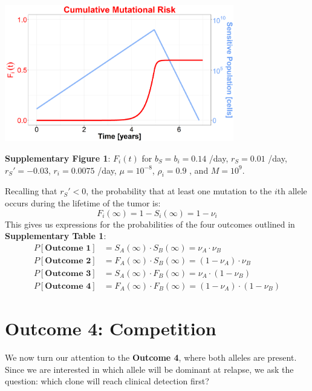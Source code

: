 \documentclass{article}
\begin{document}
\begin{center}
\includegraphics[width=0.75\textwidth]{CumMutRisk}

\textbf{Supplementary Figure 1}: $F_i(t)$ for $b_S = b_i = 0.14$ /day, $r_S = 0.01$ /day, $r_S' = -0.03$, $r_i = 0.0075$ /day, $\mu = 10^{-8}$, $\rho_i = 0.9$ , and $M = 10^9$.
\end{center}

Recalling that $r_S'<0$, the probability that at least one mutation to the $i$th allele occurs during the lifetime of the tumor is:
\begin{equation}
F_i(\infty) = 1-S_i(\infty) = 1- \nu_i
\end{equation}
This gives us expressions for the probabilities of the four outcomes outlined in \textbf{Supplementary Table 1}:
\begin{equation}
\begin{split}
P[\textbf{Outcome 1}] &= S_A(\infty)\cdot S_B(\infty) = \nu_A \cdot \nu_B \\
P[\textbf{Outcome 2}] &= F_A(\infty)\cdot S_B(\infty) = (1-\nu_A) \cdot \nu_B \\
P[\textbf{Outcome 3}] &= S_A(\infty)\cdot F_B(\infty) = \nu_A \cdot (1-\nu_B) \\
P[\textbf{Outcome 4}] &= F_A(\infty)\cdot F_B(\infty) = (1-\nu_A) \cdot (1 - \nu_B)
\end{split}
\end{equation}

\section{Outcome 4: Competition}

We now turn our attention to the \textbf{Outcome 4}, where both alleles are present.  Since we are interested in which allele will be dominant at relapse, we ask the question: which clone will reach clinical detection first?
\end{document}
